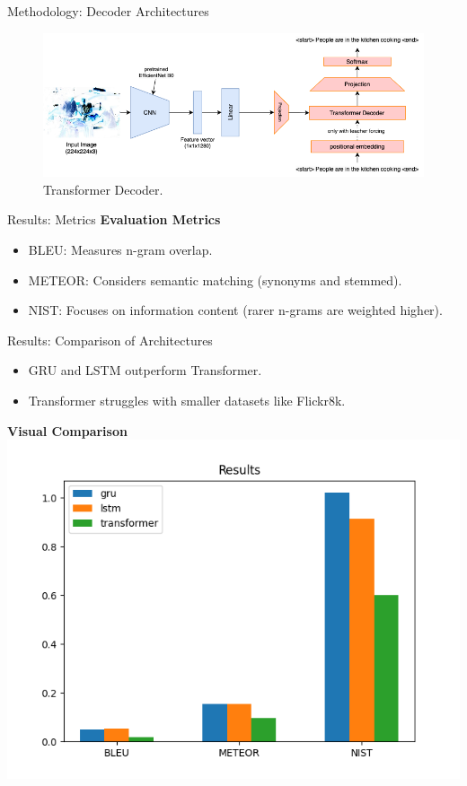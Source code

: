 \documentclass[10pt]{beamer}
\theoremstyle{remark}
\begin{document}
\begin{frame}{Methodology: Decoder Architectures}
	\begin{figure}[H]
		\includegraphics[width=.9\textwidth]{res/transformer.png}
		\caption{Transformer Decoder.}\label{fig:transformer}
	\end{figure}
\end{frame}

\begin{frame}{Results: Metrics}
	\textbf{Evaluation Metrics}
	\begin{itemize}
		\item BLEU: Measures n-gram overlap.
		\item METEOR: Considers semantic matching (synonyms and stemmed).
		\item NIST: Focuses on information content (rarer n-grams are weighted higher).
	\end{itemize}
\end{frame}

\begin{frame}{Results: Comparison of Architectures}
	\begin{itemize}
		\item GRU and LSTM outperform Transformer.
		\item Transformer struggles with smaller datasets like Flickr8k.
	\end{itemize}
	\textbf{Visual Comparison}
	\includegraphics[width=.6\textwidth]{res/metrics.png}
\end{frame}
\end{document}
